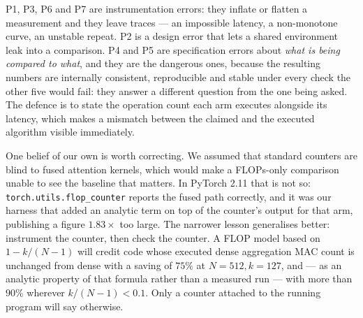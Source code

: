 P1, P3, P6 and P7 are instrumentation errors: they inflate or flatten a
measurement and they leave traces --- an impossible latency, a non-monotone
curve, an unstable repeat. P2 is a design error that lets a shared environment
leak into a comparison. P4 and P5 are specification errors about \emph{what is
being compared to what}, and they are the dangerous ones, because the resulting
numbers are internally consistent, reproducible and stable under every check
the other five would fail: they answer a different question from the one being
asked. The defence is to state the operation count each arm executes alongside
its latency, which makes a mismatch between the claimed and the executed
algorithm visible immediately.

One belief of our own is worth correcting. We assumed that standard counters
are blind to fused attention kernels, which would make a FLOPs-only comparison
unable to see the baseline that matters. In PyTorch 2.11 that is not so:
\texttt{torch.utils.flop\_counter} reports the fused path correctly, and it was
our harness that added an analytic term on top of the counter's output for that
arm, publishing a figure $1.83\times$ too large. The narrower lesson
generalises better: instrument the counter, then check the
counter. A FLOP model based on $1 - k/(N-1)$ will credit code whose executed
dense aggregation MAC count is unchanged from dense with a saving of $75\%$ at
$N{=}512, k{=}127$, and --- as an analytic property of that formula rather than
a measured run --- with more than $90\%$ wherever $k/(N-1) < 0.1$. Only a
counter attached to the running program will say otherwise.
